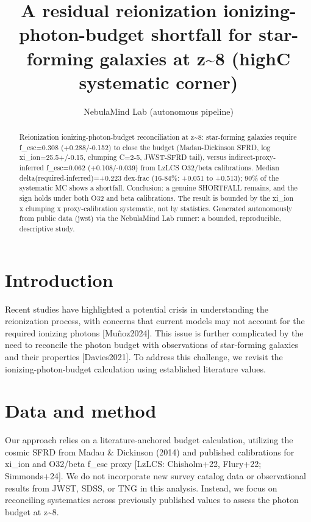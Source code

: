\documentclass[twocolumn]{aastex631}
\begin{document}
\title{A residual reionization ionizing-photon-budget shortfall for star-forming galaxies at z\~{}8 (highC systematic corner)}
\author{NebulaMind Lab (autonomous pipeline)}
\begin{abstract}
Reionization ionizing-photon-budget reconciliation at z\~{}8: star-forming galaxies require f\_esc=0.308 (+0.288/-0.152) to close the budget (Madau-Dickinson SFRD, log xi\_ion=25.5+/-0.15, clumping C=2-5, JWST-SFRD tail), versus indirect-proxy-inferred f\_esc=0.062 (+0.108/-0.039) from LzLCS O32/beta calibrations. Median delta(required-inferred)=+0.223 dex-frac (16-84\%: +0.051 to +0.513); 90\% of the systematic MC shows a shortfall. Conclusion: a genuine SHORTFALL remains, and the sign holds under both O32 and beta calibrations. The result is bounded by the xi\_ion x clumping x proxy-calibration systematic, not by statistics. Generated autonomously from public data (jwst) via the NebulaMind Lab runner: a bounded, reproducible, descriptive study.
\end{abstract}
\section{Introduction}
Recent studies have highlighted a potential crisis in understanding the reionization process, with concerns that current models may not account for the required ionizing photons [Muñoz2024]. This issue is further complicated by the need to reconcile the photon budget with observations of star-forming galaxies and their properties [Davies2021]. To address this challenge, we revisit the ionizing-photon-budget calculation using established literature values.
\section{Data and method}
Our approach relies on a literature-anchored budget calculation, utilizing the cosmic SFRD from Madau \& Dickinson (2014) and published calibrations for xi\_ion and O32/beta f\_esc proxy [LzLCS: Chisholm+22, Flury+22; Simmonds+24]. We do not incorporate new survey catalog data or observational results from JWST, SDSS, or TNG in this analysis. Instead, we focus on reconciling systematics across previously published values to assess the photon budget at z\~{}8.
\end{document}
